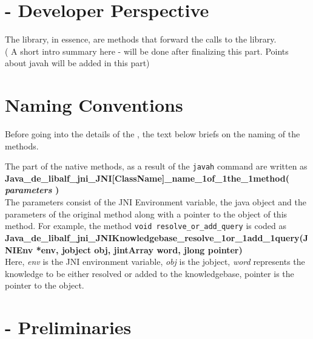 \section{\jalf - Developer Perspective}
The \jalf library, in essence, are methods that forward the calls to the \libalf library. \\
( A short intro summary here - will be done after finalizing this part. Points about javah will be added in this part) \\

\section{Naming Conventions}
Before going into the details of the \jalf, the text below briefs on the naming of the methods.

The \cpp part of the native methods, as a result of the \texttt{javah} command are written as \\
\textbf{Java\_de\_libalf\_jni\_JNI[ClassName]\_name\_1of\_1the\_1method( \emph{parameters} )} \\
The parameters consist of the JNI Environment variable, the java object and the parameters of the original method along with a pointer to the object of this method. For example, the method \texttt{void resolve\_or\_add\_query} is coded as \\
\textbf{Java\_de\_libalf\_jni\_JNIKnowledgebase\_resolve\_1or\_1add\_1query(JNIEnv *env, jobject obj, jintArray word, jlong pointer)} \\
Here, \emph{env} is the JNI environment variable,  \emph{obj} is the jobject, \emph{word} represents the knowledge to be either resolved or added to the knowledgebase, pointer is the pointer to the \cpp object. 

\section{\jalf - Preliminaries}

